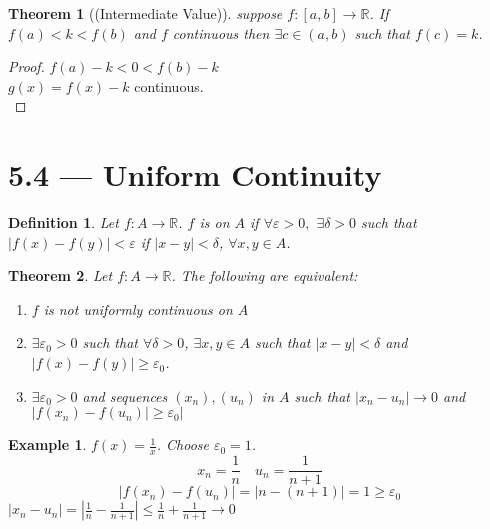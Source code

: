 \documentclass{report}
\newcommand{\bbR}{\mathbb{R}}  %
\newcommand{\xn}{(x_n)}
\theoremstyle{mystyle}
\newtheorem*{theorem}{Theorem}
\newtheorem*{definition}{Definition}
\newtheorem*{example}{Example}
\theoremstyle{customtheorem}
\begin{document}
    \begin{theorem}[(Intermediate Value)]
        suppose $f:[a,b]\to\bbR$. If $f(a)<k<f(b)$ and $f$ continuous then $\exists c\in(a,b)$ such that $f(c)=k$.
    \end{theorem}
    \begin{proof}
        $f(a)-k<0<f(b)-k$\\
        $g(x)=f(x)-k$ continuous.\\
    \end{proof}

    \section*{5.4 --- Uniform Continuity}
    \begin{definition}
        Let $f:A\to\bbR$. $f$ is  on $A$ if $\forall \varepsilon > 0,$ $\exists \delta > 0$ such that $\left|f(x)-f(y)\right|<\varepsilon$ if $|x-y|<\delta$, $\forall x,y\in A$.
    \end{definition}

    \begin{theorem}
        Let $f:A\to\bbR$. The following are equivalent:
        \begin{enumerate}[label=(\roman*)]
            \item $f$ is not uniformly continuous on $A$
            \item $\exists \varepsilon_0 > 0$ such that $\forall \delta > 0$, $\exists x,y\in A$ such that $|x-y|<\delta$ and $|f(x)-f(y)|\geq \varepsilon_0$.
            \item $\exists \varepsilon_0 > 0$ and sequences $\xn, (u_n)$ in $A$ such that $|x_n-u_n|\to 0$ and $|f\xn-f(u_n)|\geq \varepsilon_0|$
        \end{enumerate}
    \end{theorem}

    \begin{example}
        $f(x)=\frac{1}{x}$. Choose $\varepsilon_0=1$. \vspace{-1em}
        \[x_n=\frac{1}{n}\quad u_n=\frac{1}{n+1}\]
        \vspace{-1em}
        \[|f\xn-f(u_n)|=|n-(n+1)|=1\geq \varepsilon_0\]
        $|x_n-u_n|=|\frac{1}{n}-\frac{1}{n+1}|\leq \frac{1}{n}+\frac{1}{n+1}\to 0$
    \end{example}
\end{document}
